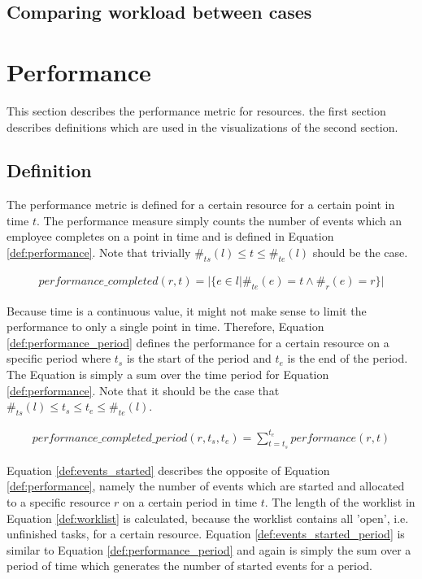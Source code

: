 \subsection{Comparing workload between cases}

\section{Performance}
This section describes the performance metric for resources. the first section describes definitions which are used in the visualizations of the second section. 

\subsection{Definition}
The performance metric is defined for a certain resource for a certain point in time $t$. The performance measure simply counts the number of events which an employee completes on a point in time and is defined in Equation \ref{def:performance}. Note that trivially $\#_{ts}(l) \leq t \leq \#_{te}(l)$ should be the case.

\begin{equation}\label{def:performance}
  \begin{array}{l}
    performance\_completed(r,t) = 
   | \{e \in l | \#_{te}(e) = t \wedge \#_{r}(e)=r \}| 
  \end{array}
\end{equation}

Because time is a continuous value, it might not make sense to limit the performance to only a single point in time. Therefore, Equation \ref{def:performance_period} defines the performance for a certain resource on a specific period where $t_s$ is the start of the period and $t_e$ is the end of the period. The Equation is simply a sum over the time period for Equation \ref{def:performance}. Note that it should be the case that $\#_{ts}(l) \leq t_s \leq t_e \leq \#_{te}(l)$.

\begin{equation}\label{def:performance_period}
  \begin{array}{l}
    performance\_completed\_period(r,t_s, t_e) = \sum_{t = t_s}^{t_e} performance(r,t)
  \end{array}
\end{equation}

Equation \ref{def:events_started} describes the opposite of Equation \ref{def:performance}, namely the number of events which are started and allocated to a specific resource $r$ on a certain period in time $t$. The length of the worklist in Equation \ref{def:worklist} is calculated, because the worklist contains all 'open', i.e. unfinished tasks, for a certain resource. Equation \ref{def:events_started_period} is similar to Equation \ref{def:performance_period} and again is simply the sum over a period of time which generates the number of started events for a period.

